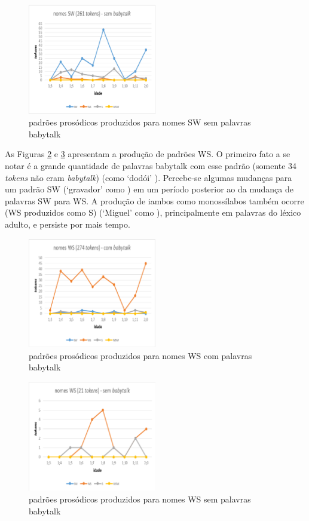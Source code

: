 \documentclass[output=paper]{LSP/langsci}
\begin{document}
\begin{figure}
\includegraphics[width=0.5\textwidth]{figures/santanafig2}
\caption{padrões prosódicos produzidos para nomes SW sem palavras babytalk}
\label{fig:santana_2}
\end{figure}

As Figuras \ref{fig:santana_3} e \ref{fig:santana_4} apresentam a produção de padrões WS. O primeiro fato a se notar é a grande quantidade de palavras babytalk com esse padrão (somente 34 \textit{tokens} não eram \textit{babytalk}) (como `dodói' ). Percebe-se algumas mudanças para um padrão SW (`gravador' como ) em um período posterior ao da mudança de palavras SW para WS. A produção de iambos como monossílabos também ocorre (WS produzidos como S) (`Miguel' como \ipa{[ge]}), principalmente em palavras do léxico adulto, e persiste por mais tempo.

\begin{figure}
\includegraphics[width=0.5\textwidth]{figures/santanafig3}
\caption{padrões prosódicos produzidos para nomes WS com palavras babytalk}
\label{fig:santana_3}
\end{figure}

\begin{figure}
\includegraphics[width=0.5\textwidth]{figures/santanafig4}
\caption{padrões prosódicos produzidos para nomes WS sem palavras babytalk}
\label{fig:santana_4}
\end{figure}
\end{document}
